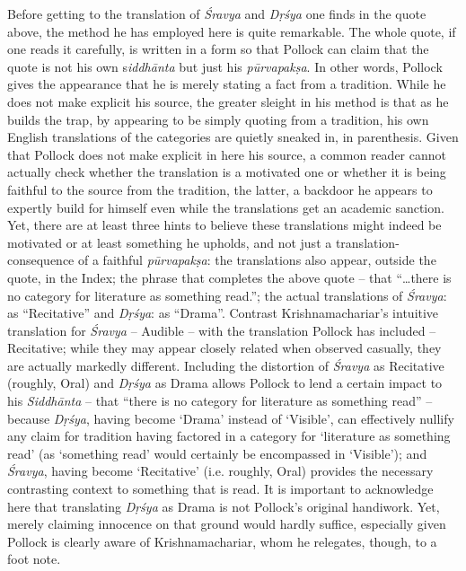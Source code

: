 Before getting to the translation of \textit{Śravya} and \textit{Dṛśya} one finds in the quote above, the method he has employed here is quite remarkable. The whole quote, if one reads it carefully, is written in a form so that Pollock can claim that the quote is not his own s\textit{iddhānta} but just his \textit{pūrvapakṣa}. In other words, Pollock gives the appearance that he is merely stating a fact from a tradition. While he does not make explicit his source, the greater sleight in his method is that as he builds the trap, by appearing to be simply quoting from a tradition, his own English translations of the categories are quietly sneaked in, in parenthesis. Given that Pollock does not make explicit in here his source, a common reader cannot actually check whether the translation is a motivated one or whether it is being faithful to the source from the tradition, the latter, a backdoor he appears to expertly build for himself even while the translations get an academic sanction. Yet, there are at least three hints to believe these translations might indeed be motivated or at least something he upholds, and not just a translation-consequence of a faithful \textit{pūrvapakṣa}: the translations also appear, outside the quote, in the Index; the phrase that completes the above quote – that “…there is no category for literature as something read.”; the actual translations of \textit{Śravya}: as “Recitative” and \textit{Dṛśya}: as “Drama”. Contrast Krishnamachariar’s intuitive translation for \textit{Śravya} – Audible – with the translation Pollock has included – Recitative; while they may appear closely related when observed casually, they are actually markedly different. Including the distortion of \textit{Śravya} as Recitative (roughly, Oral) and \textit{Dṛśya} as Drama allows Pollock to lend a certain impact to his \textit{Siddhānta} – that “there is no category for literature as something read” – because \textit{Dṛśya}, having become ‘Drama’ instead of ‘Visible’, can effectively nullify any claim for tradition having factored in a category for ‘literature as something read’ (as ‘something read’ would certainly be encompassed in ‘Visible’); and \textit{Śravya}, having become ‘Recitative’ (i.e. roughly, Oral) provides the necessary contrasting context to something that is read. It is important to acknowledge here that translating \textit{Dṛśya} as Drama is not Pollock’s original handiwork. Yet, merely claiming innocence on that ground would hardly suffice, especially given Pollock is clearly aware of Krishnamachariar, whom he relegates, though, to a foot note.


